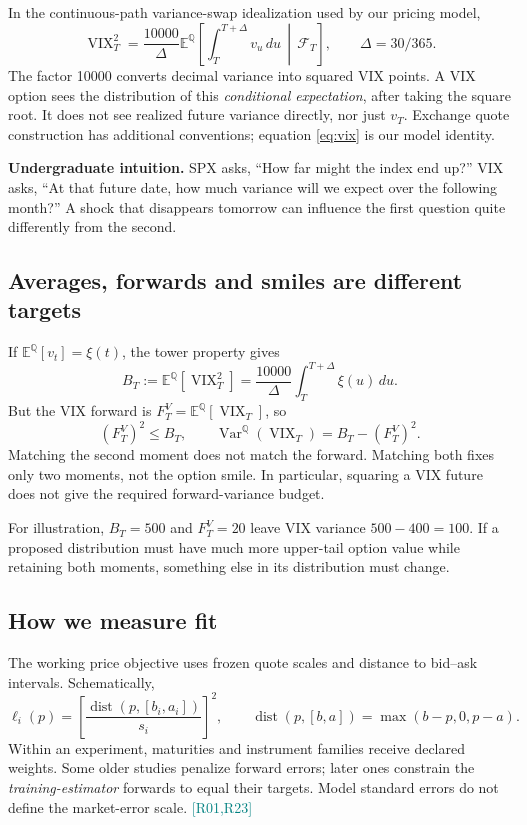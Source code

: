 \documentclass[11pt,a4paper]{article}
\newcommand{\E}{\mathbb E^{\mathbb Q}}
\newcommand{\Var}{\operatorname{Var}}
\newcommand{\VIX}{\operatorname{VIX}}
\newcommand{\src}[1]{\textcolor{teal}{\small[#1]}}
\begin{document}
In the continuous-path variance-swap idealization used by our pricing model,
\begin{equation}\label{eq:vix}
\VIX_T^2=\frac{10000}{\Delta}\E\!\left[\int_T^{T+\Delta}v_u\,du\,\middle|\,\mathcal F_T\right],
\qquad \Delta=30/365.
\end{equation}
The factor 10000 converts decimal variance into squared VIX points. A VIX option sees the distribution of this \emph{conditional expectation}, after taking the square root. It does not see realized future variance directly, nor just $v_T$. Exchange quote construction has additional conventions; equation \eqref{eq:vix} is our model identity.

\textbf{Undergraduate intuition.} SPX asks, ``How far might the index end up?'' VIX asks, ``At that future date, how much variance will we expect over the following month?'' A shock that disappears tomorrow can influence the first question quite differently from the second.

\subsection{Averages, forwards and smiles are different targets}
If $\E[v_t]=\xi(t)$, the tower property gives
\begin{equation}\label{eq:budget}
B_T:=\E[\VIX_T^2]=\frac{10000}{\Delta}\int_T^{T+\Delta}\xi(u)\,du.
\end{equation}
But the VIX forward is $F_T^V=\E[\VIX_T]$, so
\begin{equation}
(F_T^V)^2\leq B_T,\qquad \Var^{\mathbb Q}(\VIX_T)=B_T-(F_T^V)^2.
\end{equation}
Matching the second moment does not match the forward. Matching both fixes only two moments, not the option smile. In particular, squaring a VIX future does not give the required forward-variance budget.

For illustration, $B_T=500$ and $F_T^V=20$ leave VIX variance $500-400=100$. If a proposed distribution must have much more upper-tail option value while retaining both moments, something else in its distribution must change.

\subsection{How we measure fit}
The working price objective uses frozen quote scales and distance to bid--ask intervals. Schematically,
\begin{equation}
\ell_i(p)=\left[\frac{\operatorname{dist}(p,[b_i,a_i])}{s_i}\right]^2,
\qquad \operatorname{dist}(p,[b,a])=\max(b-p,0,p-a).
\end{equation}
Within an experiment, maturities and instrument families receive declared weights. Some older studies penalize forward errors; later ones constrain the \emph{training-estimator} forwards to equal their targets. Model standard errors do not define the market-error scale. \src{R01,R23}
\end{document}
